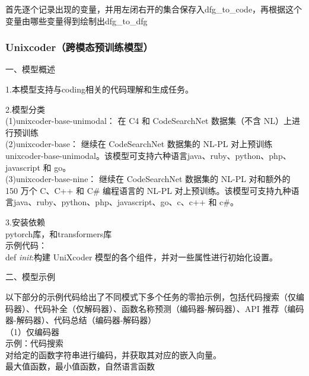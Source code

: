 \documentclass[
]{article}
\begin{document}
首先逐个记录出现的变量，并用左闭右开的集合保存入dfg\_to\_code，再根据这个变量由哪些变量得到绘制出dfg\_to\_dfg

\subsubsection{Unixcoder（跨模态预训练模型）}\label{unixcoderux8de8ux6a21ux6001ux9884ux8badux7ec3ux6a21ux578buxff09}

一、模型概述

1.本模型支持与coding相关的代码理解和生成任务。

2.模型分类\\
(1)unixcoder-base-unimodal： 在 C4 和 CodeSearchNet 数据集（不含
NL）上进行预训练\\
(2)unixcoder-base： 继续在 CodeSearchNet 数据集的 NL-PL 对上预训练
unixcoder-base-unimodal。该模型可支持六种语言java、ruby、python、php、javascript
和 go。\\
(3)unixcoder-base-nine： 继续在 CodeSearchNet 数据集的 NL-PL 对和额外的
150 万个 C、C++ 和 C\# 编程语言的 NL-PL
对上预训练。该模型可支持九种语言java、ruby、python、php、javascript、go、c、c++
和 c\#。

3.安装依赖\\
pytorch库，和transformers库\\
示例代码：\\
def \emph{init}:构建 UniXcoder
模型的各个组件，并对一些属性进行初始化设置。

二、模型示例

以下部分的示例代码给出了不同模式下多个任务的零拍示例，包括代码搜索（仅编码器）、代码补全（仅解码器）、函数名称预测（编码器-解码器）、API
推荐（编码器-解码器）、代码总结（编码器-解码器）\\
（1）仅编码器\\
示例：代码搜索\\
对给定的函数字符串进行编码，并获取其对应的嵌入向量。\\
最大值函数，最小值函数，自然语言函数
\end{document}
